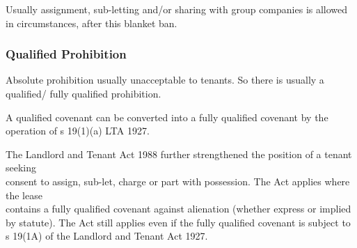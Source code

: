 \documentclass[
]{article}
\newenvironment{Shaded}{}{}
\newcommand{\NormalTok}[1]{#1}
\begin{document}
Usually assignment, sub-letting and/or sharing with group companies is
allowed in circumstances, after this blanket ban.

\hypertarget{qualified-prohibition}{%
\subsubsection{Qualified Prohibition}\label{qualified-prohibition}}

Absolute prohibition usually unacceptable to tenants. So there is
usually a qualified/ fully qualified prohibition.

\begin{Shaded}
\begin{Highlighting}[]
\NormalTok{A qualified covenant can be converted into a fully qualified covenant by the operation of s 19(1)(a) LTA 1927. }
\end{Highlighting}
\end{Shaded}

The Landlord and Tenant Act 1988 further strengthened the position of a
tenant seeking\\
consent to assign, sub-let, charge or part with possession. The Act
applies where the lease\\
contains a fully qualified covenant against alienation (whether express
or implied by statute). The Act still applies even if the fully
qualified covenant is subject to s 19(1A) of the Landlord and Tenant Act
1927.
\end{document}
